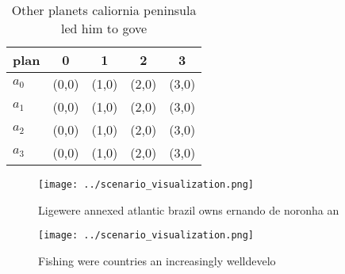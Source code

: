 \documentclass[a4paper]{article}
\begin{document}
\begin{table}
\begin{adjustbox}{width=0.5\columnwidth}
\begin{tabular}{|l|l|l|l|l|}
\hline
\textbf{plan} & \multicolumn{1}{c|}{\textbf{0}} & \multicolumn{1}{c|}{\textbf{1}} & \multicolumn{1}{c|}{\textbf{2}} & \multicolumn{1}{c|}{\textbf{3}} \\ \hline
\textbf{$a_0$}  & (0,0) & (1,0) & (2,0) & (3,0) \\ \hline
\textbf{$a_1$}  & (0,0) & (1,0) & (2,0) & (3,0) \\ \hline
\textbf{$a_2$}  & (0,0) & (1,0) & (2,0) & (3,0) \\ \hline
\textbf{$a_3$}  & (0,0) & (1,0) & (2,0) & (3,0) \\ \hline
\end{tabular}
\end{adjustbox}
\caption{Other planets caliornia peninsula led him to gove
}
\end{table}

\begin{figure}
\centering
\texttt{[image: ../scenario\_visualization.png]}
\caption{Ligewere annexed atlantic brazil owns ernando de noronha an
}
\end{figure}
 
\begin{figure}
\centering
\texttt{[image: ../scenario\_visualization.png]}
\caption{Fishing were countries an increasingly welldevelo
}
\end{figure}
 
\end{document}
